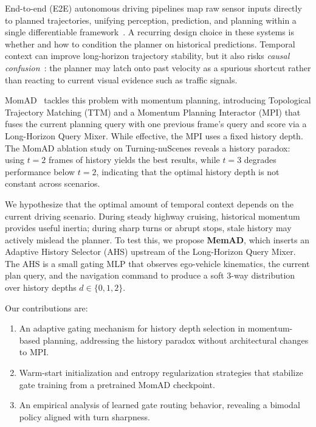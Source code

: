 \documentclass{article}
\begin{document}
End-to-end (E2E) autonomous driving pipelines map raw sensor inputs directly to planned trajectories, unifying perception, prediction, and planning within a single differentiable framework~\cite{hu2023uniad,sun2024sparsedrive,jiang2023vad}.
A recurring design choice in these systems is whether and how to condition the planner on historical predictions.
Temporal context can improve long-horizon trajectory stability, but it also risks \emph{causal confusion}~\cite{dehaan2019causal}: the planner may latch onto past velocity as a spurious shortcut rather than reacting to current visual evidence such as traffic signals.

MomAD~\cite{li2025momad} tackles this problem with momentum planning, introducing Topological Trajectory Matching (TTM) and a Momentum Planning Interactor (MPI) that fuses the current planning query with one previous frame's query and score via a Long-Horizon Query Mixer.
While effective, the MPI uses a fixed history depth.
The MomAD ablation study on Turning-nuScenes reveals a history paradox: using $t{=}2$ frames of history yields the best results, while $t{=}3$ degrades performance below $t{=}2$, indicating that the optimal history depth is not constant across scenarios.

We hypothesize that the optimal amount of temporal context depends on the current driving scenario.
During steady highway cruising, historical momentum provides useful inertia; during sharp turns or abrupt stops, stale history may actively mislead the planner.
To test this, we propose \textbf{MemAD}, which inserts an Adaptive History Selector (AHS) upstream of the Long-Horizon Query Mixer.
The AHS is a small gating MLP that observes ego-vehicle kinematics, the current plan query, and the navigation command to produce a soft 3-way distribution over history depths $d \in \{0, 1, 2\}$.

Our contributions are:
\begin{enumerate}
    \item An adaptive gating mechanism for history depth selection in momentum-based planning, addressing the history paradox without architectural changes to MPI.
    \item Warm-start initialization and entropy regularization strategies that stabilize gate training from a pretrained MomAD checkpoint.
    \item An empirical analysis of learned gate routing behavior, revealing a bimodal policy aligned with turn sharpness.
\end{enumerate}
\end{document}
